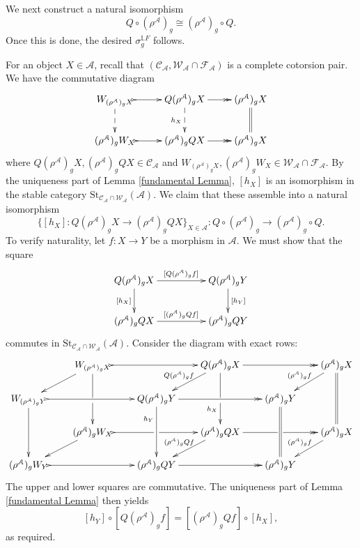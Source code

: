 \documentclass[12pt,twoside]{amsart}
\theoremstyle{bfupright head,slanted body}
\theoremstyle{bfupright head,upright body}
\theoremstyle{fixed bf head,slanted body}
\theoremstyle{fixed bf head,upright body}
\theoremstyle{numbered paragraph}
\newenvironment{prf*}[1][Proof]{%
  \begin{proof}[\bf #1]
    \setcounter{equation}{0}
    \renewcommand{\theequation}{\arabic{equation}}}
  {\end{proof}
}
\numberwithin{equation}{res}
\newcommand{\calC}{\mathcal{C}}
\newcommand{\calW}{\mathcal{W}}
\newcommand{\calF}{\mathcal{F}}
\newcommand{\calA}{\mathcal{A}}
\newcommand{\St}{\mathrm{St}}
\begin{document}
\begin{prf*}
We next construct a natural isomorphism
\[
Q\circ(\rho^\calA)_g \cong (\rho^\calA)_g\circ Q.
\]
Once this is done, the desired \(\sigma_g^{\mathbb{L}F}\) follows.

For an object \(X\in\calA\), recall that \((\calC_\calA,\calW_\calA\cap\calF_\calA)\) is a complete cotorsion pair.
We have the commutative diagram
\[
\xymatrix{
   W_{(\rho^\calA)_g X} \ar@{-->}[d] \ar@{>->}[r]
&  Q(\rho^\calA)_g X \ar@{-->}[d]_{h_X} \ar@{->>}[r]
&  (\rho^\calA)_g X \ar@{=}[d] \\
   (\rho^\calA)_g W_X \ar@{>->}[r]
&  (\rho^\calA)_g QX \ar@{->>}[r]
&  (\rho^\calA)_g X
}
\]
where \(Q(\rho^\calA)_g X,(\rho^\calA)_g QX\in\calC_\calA\) and
\(W_{(\rho^\calA)_g X},(\rho^\calA)_g W_X\in\calW_\calA\cap\calF_\calA\).
By the uniqueness part of Lemma \ref{fundamental Lemma}, \([h_X]\) is an isomorphism in the stable category \(\St_{\calC_\calA\cap\calW_\calA}(\calA)\). We claim that these assemble into a natural isomorphism
\[
\{[h_X]:Q(\rho^\calA)_g X\to(\rho^\calA)_g QX\}_{X\in\calA}
:
Q\circ(\rho^\calA)_g
\longrightarrow
(\rho^\calA)_g\circ Q.
\]
To verify naturality, let \(f:X\to Y\) be a morphism in \(\calA\). We must show that the square
\[
\xymatrix@C=1.75CM{
   Q(\rho^\calA)_g X \ar[d]_{[h_X]} \ar[r]^{[Q(\rho^\calA)_g f]}
&  Q(\rho^\calA)_g Y \ar[d]^{[h_Y]} \\
   (\rho^\calA)_g QX \ar[r]^{[(\rho^\calA)_g Qf]}
&  (\rho^\calA)_g QY
}
\]
commutes in \(\St_{\calC_\calA\cap\calW_\calA}(\calA)\). Consider the diagram with exact rows:
\[
\xymatrix@C=0.7CM @R=0.6CM{
&     W_{(\rho^\calA)_g X}   \ar@{>->}[rr]     \ar'[d][dd]              \ar[dl]
&  &  Q(\rho^\calA)_g X     \ar@{->>}[rr]     \ar'[d][dd]_(0.3){h_X}   \ar[dl]_{Q(\rho^\calA)_g f}
&  &  (\rho^\calA)_g X       \ar@{=}[dd]                                \ar[dl]_{(\rho^\calA)_g f}          \\
      W_{(\rho^\calA)_g Y}   \ar@{>->}[rr]     \ar[dd]
&  &  Q(\rho^\calA)_g Y     \ar@{->>}[rr]     \ar[dd]_(0.3){h_Y}
&  &  (\rho^\calA)_g Y       \ar@{=}[dd]                                                                  \\
   &  (\rho^\calA)_g W_X     \ar@{>->}'[r][rr]                          \ar[dl]
&  &  (\rho^\calA)_g QX     \ar@{->>}'[r][rr]                          \ar[dl]_{(\rho^\calA)_g Qf}
&  &  (\rho^\calA)_g X                                                  \ar[dl]_{(\rho^\calA)_g f}          \\
      (\rho^\calA)_g W_Y     \ar@{>->}[rr]
&  &  (\rho^\calA)_g QY     \ar@{->>}[rr]
&  &  (\rho^\calA)_g Y                     }
\]
The upper and lower squares are commutative. The uniqueness part of Lemma \ref{fundamental Lemma} then yields
\[
[h_Y]\circ[Q(\rho^\calA)_g f]
=
[(\rho^\calA)_g Qf]\circ[h_X],
\]
as required.


\end{prf*}
\end{document}
